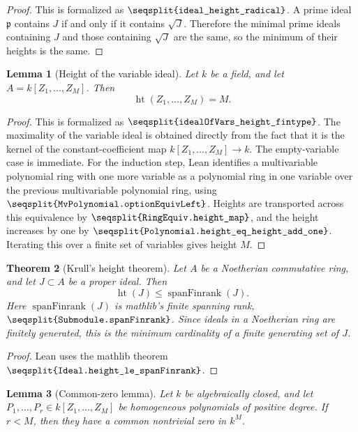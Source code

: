 \documentclass[uplatex,dvipdfmx]{jsarticle}
\newcommand{\lean}[1]{\texttt{\expandafter\seqsplit\expandafter{\detokenize{#1}}}}
\theoremstyle{matrixsosdefinition}
\newtheorem{theorem}{Theorem}
\newtheorem{lemma}[theorem]{Lemma}
\begin{document}
\begin{proof}
  This is formalized as \(\lean{ideal_height_radical}\).
  A prime ideal \(\mathfrak p\) contains \(J\) if and only if it contains
  \(\sqrt J\).  Therefore the minimal prime ideals containing \(J\) and those
  containing \(\sqrt J\) are the same, so the minimum of their heights is the
  same.
\end{proof}

\begin{lemma}[Height of the variable ideal]\label{lem:height-ideal-of-vars-en}
  Let \(k\) be a field, and let \(A=k[Z_1,\ldots,Z_M]\). Then
  \[
    \operatorname{ht}(Z_1,\ldots,Z_M)=M.
  \]
\end{lemma}

\begin{proof}
  This is formalized as \(\lean{idealOfVars_height_fintype}\).
  The maximality of the variable ideal is obtained directly from the fact that
  it is the kernel of the constant-coefficient map \(k[Z_1,\ldots,Z_M]\to k\).
  The empty-variable case is immediate.  For the induction step, Lean identifies
  a multivariable polynomial ring with one more variable as a polynomial ring in
  one variable over the previous multivariable polynomial ring, using
  \(\lean{MvPolynomial.optionEquivLeft}\).  Heights are transported across this
  equivalence by \(\lean{RingEquiv.height_map}\), and the height increases by
  one by \(\lean{Polynomial.height_eq_height_add_one}\).  Iterating this over a
  finite set of variables gives height \(M\).
\end{proof}

\begin{theorem}[Krull's height theorem]\label{thm:krull-height-en}
  Let \(A\) be a Noetherian commutative ring, and let \(J\subset A\) be a
  proper ideal. Then
  \[
    \operatorname{ht}(J)\le \operatorname{spanFinrank}(J).
  \]
  Here \(\operatorname{spanFinrank}(J)\) is mathlib's finite spanning rank,
  \(\lean{Submodule.spanFinrank}\).  Since ideals in a Noetherian ring are
  finitely generated, this is the minimum cardinality of a finite generating
  set of \(J\).
\end{theorem}

\begin{proof}
  Lean uses the mathlib theorem \(\lean{Ideal.height_le_spanFinrank}\).
\end{proof}

\begin{lemma}[Common-zero lemma]\label{lem:projective-common-zero-en}
  Let \(k\) be algebraically closed, and let
  \(P_1,\ldots,P_r\in k[Z_1,\ldots,Z_M]\) be homogeneous polynomials of positive
  degree.  If \(r<M\), then they have a common nontrivial zero in \(k^M\).
\end{lemma}
\end{document}
